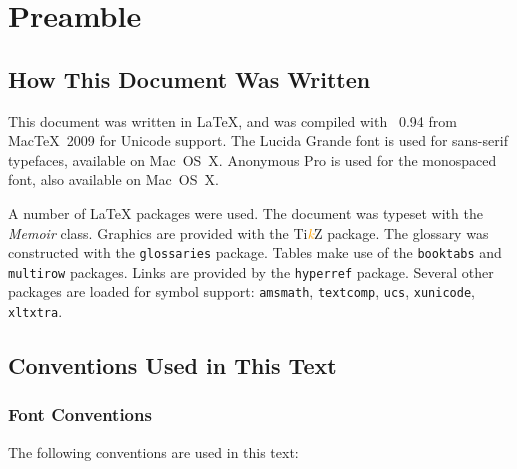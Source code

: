 \chapter{Preamble}

\section{How This Document Was Written}
\label{sec:preamble:how}
\newcommand*{\TikZ}{Ti\textcolor{orange}{\emph{k}}Z}
This document was written in \LaTeX, and was compiled with \XeTeX~0.94 from Mac\TeX\ 2009 for Unicode support.  The Lucida Grande font is used for sans-serif typefaces, available on Mac~OS~X.
Anonymous Pro is used for the monospaced font, also available on Mac~OS~X.

A number of \LaTeX{} packages were used.
The document was typeset with the \textit{Memoir} class.
Graphics are provided with the {\TikZ} package.
The glossary was constructed with the \texttt{glossaries} package.
Tables make use of the \texttt{booktabs} and \texttt{multirow} packages.
Links are provided by the \texttt{hyperref} package.
Several other packages are loaded for symbol support: \texttt{amsmath},
    \texttt{textcomp}, \texttt{ucs}, \texttt{xunicode}, \texttt{xltxtra}.


\section{Conventions Used in This Text}
\label{sec:preamble:conventions}

\subsection{Font Conventions}
\label{sec:preamble:fonts}

The following conventions are used in this text:

